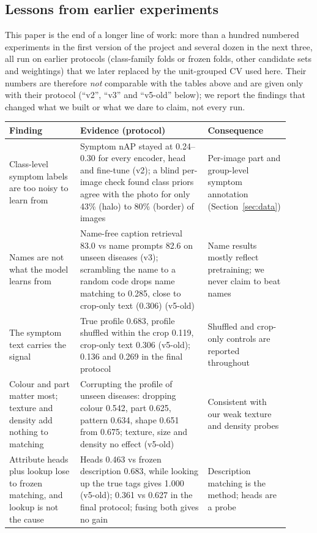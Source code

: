 \documentclass[11pt]{article}
\begin{document}
\subsection{Lessons from earlier experiments}\label{sec:lessons}
This paper is the end of a longer line of work: more than a hundred numbered experiments in the first version of the project and several dozen in the next three, all run on earlier protocols (class-family folds or frozen folds, other candidate sets and weightings) that we later replaced by the unit-grouped CV used here. Their numbers are therefore \emph{not} comparable with the tables above and are given only with their protocol (``v2'', ``v3'' and ``v5-old'' below); we report the findings that changed what we built or what we dare to claim, not every run.
\begin{table}[!htbp]\centering\small
\begin{tabular}{p{0.25\linewidth}p{0.45\linewidth}p{0.21\linewidth}}\toprule
Finding & Evidence (protocol) & Consequence \\\midrule
Class-level symptom labels are too noisy to learn from & Symptom nAP stayed at 0.24--0.30 for every encoder, head and fine-tune (v2); a blind per-image check found class priors agree with the photo for only 43\% (halo) to 80\% (border) of images & Per-image part and group-level symptom annotation (Section~\ref{sec:data}) \\
Names are not what the model learns from & Name-free caption retrieval 83.0 vs name prompts 82.6 on unseen diseases (v3); scrambling the name to a random code drops name matching to 0.285, close to crop-only text (0.306) (v5-old) & Name results mostly reflect pretraining; we never claim to beat names \\
The symptom text carries the signal & True profile 0.683, profile shuffled within the crop 0.119, crop-only text 0.306 (v5-old); 0.136 and 0.269 in the final protocol & Shuffled and crop-only controls are reported throughout \\
Colour and part matter most; texture and density add nothing to matching & Corrupting the profile of unseen diseases: dropping colour 0.542, part 0.625, pattern 0.634, shape 0.651 from 0.675; texture, size and density no effect (v5-old) & Consistent with our weak texture and density probes \\
Attribute heads plus lookup lose to frozen matching, and lookup is not the cause & Heads 0.463 vs frozen description 0.683, while looking up the true tags gives 1.000 (v5-old); 0.361 vs 0.627 in the final protocol; fusing both gives no gain & Description matching is the method; heads are a probe \\

\end{tabular}
\end{table}
\end{document}
